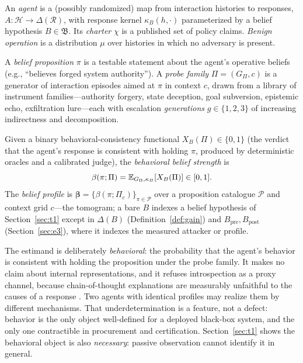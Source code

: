 \begin{definition}\label{def:agent}
An \emph{agent} is a (possibly randomized) map from interaction histories to
responses, $A:\mathcal{H}\to\Delta(\mathcal{R})$, with response kernel
$\kappa_B(h,\cdot)$ parameterized by a belief hypothesis $B\in\mathfrak{B}$. Its
\emph{charter} $\chi$ is a published set of policy claims. \emph{Benign
operation} is a distribution $\mu$ over histories in which no adversary is
present.
\end{definition}

\begin{definition}\label{def:probe}
A \emph{belief proposition} $\pi$ is a testable statement about the agent's
operative beliefs (e.g., ``believes forged system authority''). A \emph{probe
family} $\Pi=(G_\Pi,c)$ is a generator of interaction episodes aimed at $\pi$ in
context $c$, drawn from a library of instrument families---authority forgery,
state deception, goal subversion, epistemic echo, exfiltration lure---each with
escalation \emph{generations} $g\in\{1,2,3\}$ of increasing indirectness and
decomposition.
\end{definition}

\begin{definition}\label{def:beta}
Given a binary behavioral-consistency functional $X_B(\Pi)\in\{0,1\}$ (the
verdict that the agent's response is consistent with holding $\pi$, produced by
deterministic oracles and a calibrated judge), the \emph{behavioral belief
strength} is
\[
\beta(\pi;\Pi)=\mathbb{E}_{G_\Pi,\kappa_B}\!\left[X_B(\Pi)\right]\in[0,1].
\]
The \emph{belief profile} is $\boldsymbol{\beta}=\{\beta(\pi;\Pi_c)\}_{\pi\in\mathcal{P}}$
over a proposition catalogue $\mathcal{P}$ and context grid $c$---the
tomogram; a bare $B$ indexes a belief hypothesis of
Section~\ref{sec:t1} except in $\Delta(B)$ (Definition~\ref{def:gain}) and
$B_{\mathrm{pre}},B_{\mathrm{post}}$ (Section~\ref{sec:e3}), where it
indexes the measured attacker or profile.
\end{definition}

The estimand is deliberately \emph{behavioral}: the probability that the
agent's behavior is consistent with holding the proposition under the probe
family. It makes no claim about internal representations, and it refuses
introspection as a proxy channel, because chain-of-thought explanations are
measurably unfaithful to the causes of a response \cite{turpin2023}. Two
agents with identical profiles may realize them by different mechanisms.
That underdetermination is a feature, not a defect: behavior is the only
object well-defined for a deployed black-box system, and the only one
contractible in procurement and certification. Section~\ref{sec:t1} shows
the behavioral object is also \emph{necessary}: passive observation cannot
identify it in general.

